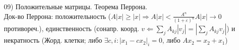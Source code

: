 09) Положительные матрицы. Теорема Перрона.\\
Док-во Перрона: положительность ($ A|x| \ge |x| \Rightarrow A|x| < \frac{A^n}{(1+\varepsilon)^n}A|x| \to 0$ противореч.), единственность (сонапр. коорд. $v \Leftarrow \sum\limits_{j} A_{kj} |v_j| = |\sum\limits_{j} A_{kj} v_j| $) и некратность (Жорд. клетки; либо $\exists c, i: |x_1 - c x_2|_i = 0$, либо $ A x_2 = x_2 + x_1 $)\\
